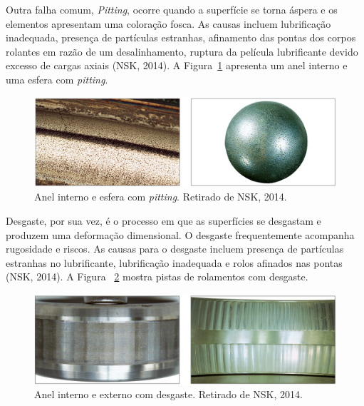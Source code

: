 \documentclass[
	12pt,				
	oneside,			
	a4paper,			
	english,			
	brazil,			
	]{abntex2ppgsi}
\begin{document}
Outra falha comum, \textit{Pitting}, ocorre quando a superfície se torna áspera e os elementos apresentam uma coloração fosca. As causas incluem lubrificação inadequada, presença de partículas estranhas, afinamento das pontas dos corpos rolantes em razão de um desalinhamento, ruptura da película lubrificante devido excesso de cargas axiais (NSK, 2014). A Figura~\ref{pitting_nsk} apresenta um anel interno e uma esfera com \textit{pitting}.

\begin{figure}[H]
\centering
\includegraphics[width=\textwidth,height=\textheight,keepaspectratio]{pitting_nsk}
\caption {Anel interno e esfera com \textit{pitting}. Retirado de NSK, 2014.}
\label{pitting_nsk}
\end{figure}

Desgaste, por sua vez, é o processo em que as superfícies se desgastam e produzem uma deformação dimensional. O desgaste frequentemente acompanha rugosidade e riscos. As causas para o desgaste incluem presença de partículas estranhas no lubrificante, lubrificação inadequada e rolos afinados nas pontas (NSK, 2014). A Figura ~\ref{desgaste_nsk} mostra pistas de rolamentos com desgaste.

\begin{figure}[H]
\centering
\includegraphics[width=\textwidth,height=\textheight,keepaspectratio]{desgaste_nsk}
\caption {Anel interno e externo com desgaste. Retirado de NSK, 2014.}
\label{desgaste_nsk}
\end{figure}

\end{document}
